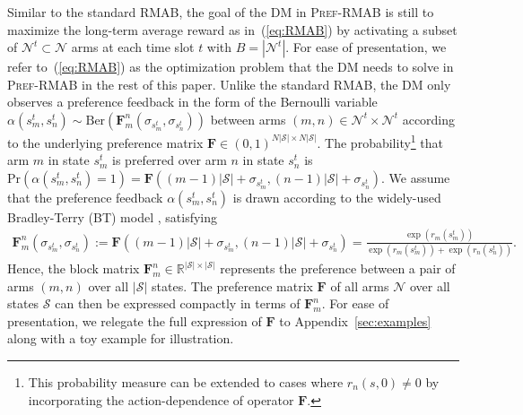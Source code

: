 \documentclass{article} %
\newcommand{\RMABPF}{\textsc{Pref-RMAB}\xspace}
\newcommand{\I}{\sigma}
\newcommand{\bF}{\mathbf{F}}
\newcommand{\cS}{\mathcal{S}}
\newcommand{\cN}{\mathcal{N}}
\begin{document}
Similar to the standard RMAB, the goal of the DM in \RMABPF is still to maximize the long-term average reward as in~(\ref{eq:RMAB}) by activating a subset of $\cN^t\subset\cN$ arms at each time slot $t$ with $B=|\cN^t|$. For ease of presentation, we refer to~(\ref{eq:RMAB}) as the optimization problem that the DM needs to solve in \RMABPF in the rest of this paper. 
Unlike the standard RMAB, the DM only observes a preference feedback in the form of the Bernoulli variable $\alpha(s_m^t,s_n^t) \sim\text{Ber}(\bF_m^n(\I_{s_m^t},\I_{s_n^t}))$ between arms $(m,n)\in\cN^t\times\cN^t$ according to the underlying preference matrix $\bF \in (0,1)^{N|\cS| \times N|\cS|}$.  The probability\footnote{This probability measure can be extended to cases where $r_n(s,0)\neq 0$ by incorporating the action-dependence of operator $\bF$.} that arm $m$ in state $s_m^t$ is preferred over arm $n$ in state $s_n^t$ is $\text{Pr}(\alpha(s_m^t,s_n^t) = 1) = \bF((m-1)|\cS|+\I_{s_{m}^t}, (n-1)|\cS|+\I_{s_{n}^t})$. We assume that the preference feedback $\alpha(s_m^t,s_n^t)$ is drawn according to the widely-used Bradley-Terry (BT) model \citep{bradley1952rank}, satisfying 
\begin{align}\label{eq:F_definition}
   \bF_m^n(\I_{s_m^t},\I_{s_n^t}) :=\bF((m-1)|\cS|+\I_{s_{m}^t},(n-1)|\cS|+\I_{s_{n}^t})=\frac{\exp(r_m(s_{m}^t))}{\exp(r_m(s_{m}^t))+\exp(r_n(s_{n}^t))}.
\end{align}
Hence, the block matrix $\bF_m^n\in\mathbb{R}^{|\cS|\times|\cS|}$ represents the preference between a pair of arms $(m, n)$ over all $|\cS|$ states. The preference matrix $\bF$ of all arms $\cN$ over all states $\cS$ can then be expressed compactly in terms of $\bF_m^n$. For ease of presentation, we relegate the full expression of $\bF$ to Appendix~\ref{sec:examples} along with a toy example for illustration.
\end{document}
